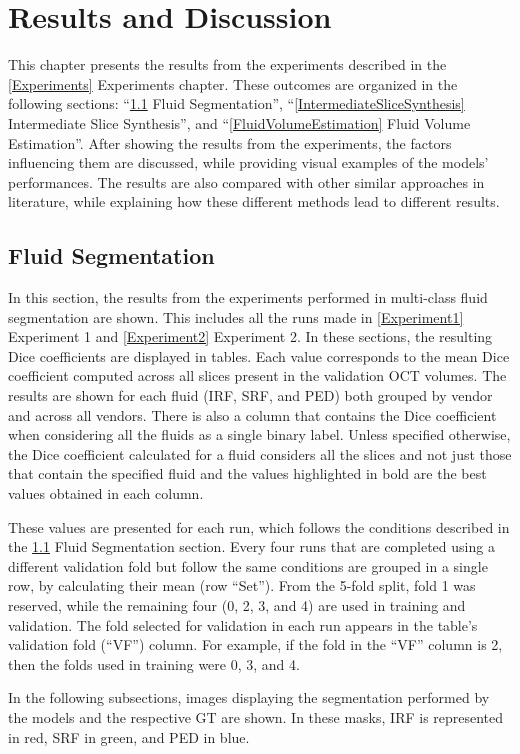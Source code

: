 \chapter{Results and Discussion}\label{ResultsDiscussion}

This chapter presents the results from the experiments described in the \ref{Experiments} Experiments chapter. These outcomes are organized in the following sections: ``\ref{FluidSegmentation} Fluid Segmentation'', ``\ref{IntermediateSliceSynthesis} Intermediate Slice Synthesis'', and ``\ref{FluidVolumeEstimation} Fluid Volume Estimation''. After showing the results from the experiments, the factors influencing them are discussed, while providing visual examples of the models' performances. The results are also compared with other similar approaches in literature, while explaining how these different methods lead to different results.

\section{Fluid Segmentation}\label{FluidSegmentation}
In this section, the results from the experiments performed in multi-class fluid segmentation are shown. This includes all the runs made in \ref{Experiment1} Experiment 1 and \ref{Experiment2} Experiment 2. In these sections, the resulting Dice coefficients are displayed in tables. Each value corresponds to the mean Dice coefficient computed across all slices present in the validation OCT volumes. The results are shown for each fluid (IRF, SRF, and PED) both grouped by vendor and across all vendors. There is also a column that contains the Dice coefficient when considering all the fluids as a single binary label. Unless specified otherwise, the Dice coefficient calculated for a fluid considers all the slices and not just those that contain the specified fluid and the values highlighted in bold are the best values obtained in each column. 
\par
These values are presented for each run, which follows the conditions described in the \ref{FluidSegmentation} Fluid Segmentation section. Every four runs that are completed using a different validation fold but follow the same conditions are grouped in a single row, by calculating their mean (row ``Set''). From the 5-fold split, fold 1 was reserved, while the remaining four (0, 2, 3, and 4) are used in training and validation. The fold selected for validation in each run appears in the table's validation fold (``VF'') column. For example, if the fold in the ``VF'' column is 2, then the folds used in training were 0, 3, and 4.
\par
In the following subsections, images displaying the segmentation performed by the models and the respective GT are shown. In these masks, IRF is represented in red, SRF in green, and PED in blue.

